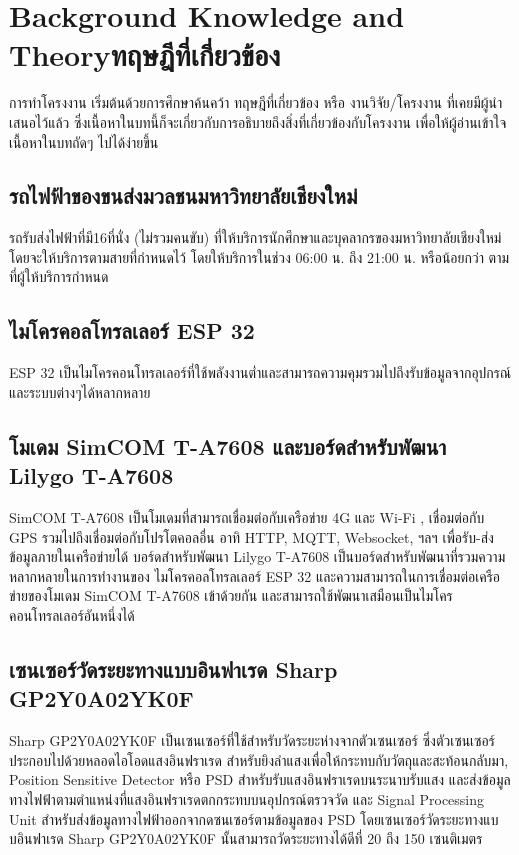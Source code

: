 \chapter{\ifenglish Background Knowledge and Theory\else ทฤษฎีที่เกี่ยวข้อง\fi}

การทำโครงงาน เริ่มต้นด้วยการศึกษาค้นคว้า ทฤษฎีที่เกี่ยวข้อง หรือ งานวิจัย/โครงงาน ที่เคยมีผู้นำเสนอไว้แล้ว ซึ่งเนื้อหาในบทนี้ก็จะเกี่ยวกับการอธิบายถึงสิ่งที่เกี่ยวข้องกับโครงงาน เพื่อให้ผู้อ่านเข้าใจเนื้อหาในบทถัดๆ ไปได้ง่ายขึ้น

\section{รถไฟฟ้าของขนส่งมวลชนมหาวิทยาลัยเชียงใหม่}
รถรับส่งไฟฟ้าที่มี16ที่นั่ง (ไม่รวมคนขับ) ที่ให้บริการนักศึกษาและบุคลากรของมหาวิทยาลัยเชียงใหม่ โดยจะให้บริการตามสายที่กำหนดไว้ โดยให้บริการในช่วง 06:00 น. ถึง 21:00 น. หรือน้อยกว่า ตามที่ผู้ให้บริการกำหนด

\section{ไมโครคอลโทรลเลอร์ ESP 32}
ESP 32 เป็นไมโครคอนโทรลเลอร์ที่ใช้พลังงานต่ำและสามารถความคุมรวมไปถึงรับข้อมูลจากอุปกรณ์และระบบต่างๆได้หลากหลาย

\section{โมเดม SimCOM T-A7608 และบอร์ดสำหรับพัฒนา Lilygo T-A7608}
SimCOM T-A7608 เป็นโมเดมที่สามารถเชื่อมต่อกับเครือข่าย 4G และ Wi-Fi , เชื่อมต่อกับ GPS รวมไปถึงเชื่อมต่อกับโปรโตคอลอื่น อาทิ HTTP, MQTT, Websocket, ฯลฯ เพื่อรับ-ส่งข้อมูลภายในเครือข่ายได้
บอร์ดสำหรับพัฒนา Lilygo T-A7608 เป็นบอร์ดสำหรับพัฒนาที่รวมความหลากหลายในการทำงานของ ไมโครคอลโทรลเลอร์ ESP 32 และความสามารถในการเชื่อมต่อเครือข่ายของโมเดม SimCOM T-A7608 เข้าด้วยกัน และสามารถใช้พัฒนาเสมือนเป็นไมโครคอนโทรลเลอร์อันหนึ่งได้


\section{เซนเซอร์วัดระยะทางแบบอินฟาเรด Sharp GP2Y0A02YK0F}
Sharp GP2Y0A02YK0F เป็นเซนเซอร์ที่ใช้สำหรับวัดระยะห่างจากตัวเซนเซอร์ ซึ่งตัวเซนเซอร์ประกอบไปด้วยหลอดไอโอดแสงอินฟราเรด สำหรับยิงลำแสงเพื่อให้กระทบกับวัตถุและสะท้อนกลับมา, Position Sensitive Detector หรือ PSD สำหรับรับแสงอินฟราเรดบนระนาบรับแสง และส่งข้อมูลทางไฟฟ้าตามตำแหน่งที่แสงอินฟราเรดตกกระทบบนอุปกรณ์ตรวจวัด และ Signal Processing Unit สำหรับส่งข้อมูลทางไฟฟ้าออกจากดซนเซอร์ตามข้อมูลของ PSD โดยเซนเซอร์วัดระยะทางแบบอินฟาเรด Sharp GP2Y0A02YK0F นั้นสามารถวัดระยะทางได้ดีที่ 20 ถึง 150 เซนติเมตร

